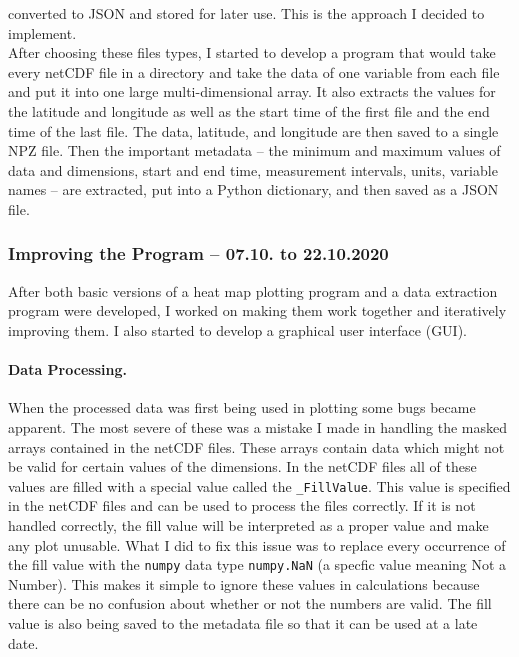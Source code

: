 \documentclass[../00_main.tex]{subfiles}
\begin{document}
converted to JSON and stored for later use. This is the approach I decided to
implement.\\
After choosing these files types, I started to develop a program that would
take every netCDF file in a directory and take the data of one variable from
each file and put it into one large multi-dimensional array. It also extracts
the values for the latitude and longitude as well as the start time of the
first file and the end time of the last file. The data, latitude, and longitude
are then saved to a single NPZ file. Then the important metadata -- the minimum
and maximum values of data and dimensions, start and end time, measurement
intervals, units, variable names -- are extracted, put into a Python
dictionary, and then saved as a JSON file.

\subsubsection{Improving the Program -- 07.10. to 22.10.2020}

After both basic versions of a heat map plotting program and a data extraction
program were developed, I worked on making them work together and
iteratively improving them. I also started to develop a graphical user
interface (GUI).

\paragraph{Data Processing.}

When the processed data was first being used in plotting some bugs became
apparent. The most severe of these was a mistake I made in handling the masked
arrays contained in the netCDF files. These arrays contain data which might not
be valid for certain values of the dimensions. In the netCDF files all of these
values are filled with a special value called the \texttt{\_FillValue}. This
value is specified in the netCDF files and can be used to process the files
correctly. If it is not handled correctly, the fill value will be interpreted
as a proper value and make any plot unusable. What I did to fix this issue was
to replace every occurrence of the fill value with the \texttt{numpy} data type
\texttt{numpy.NaN} (a specfic value meaning Not a Number). This makes it simple
to ignore these values in calculations because there can be no confusion about
whether or not the numbers are valid. The fill value is also being saved to the
metadata file so that it can be used at a late date.
\end{document}
